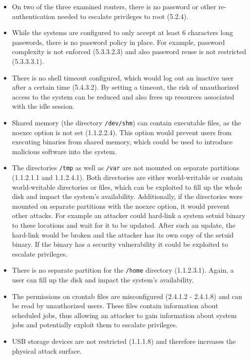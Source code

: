 \begin{itemize}
    \item On two of the three examined routers, there is no password or other re-authentication needed to escalate privileges to root (5.2.4).
    \item While the systems are configured to only accept at least 6 characters long passwords, there is no password policy in place.
    For example, password complexity is not enforced (5.3.3.2.3) and also password reuse is not restricted (5.3.3.3.1).
    \item There is no shell timeout configured, which would log out an inactive user after a certain time (5.4.3.2).
    By setting a timeout, the risk of unauthorized access to the system can be reduced and also frees up resources associated with the idle session.
    \item Shared memory (the directory \texttt{/dev/shm}) can contain executable files, as the noexec option is not set (1.1.2.2.4).
    This option would prevent users from executing binaries from shared memory, which could be used to introduce malicious software into the system.
    \item The directories \texttt{/tmp} as well as \texttt{/var} are not mounted on separate partitions (1.1.2.1.1 and 1.1.2.4.1).
    Both directories are either world-writable or contain world-writable directories or files, which can be exploited to fill up the whole disk and impact the system's availability.
    Additionally, if the directories were mounted on separate partitions with the noexec option, it would prevent other attacks.
    For example an attacker could hard-link a system setuid binary to these locations and wait for it to be updated.
    After such an update, the hard-link would be broken and the attacker has its own copy of the setuid binary.
    If the binary has a security vulnerability it could be exploited to escalate privileges.
    \item There is no separate partition for the \texttt{/home} directory (1.1.2.3.1).
    Again, a user can fill up the disk and impact the system's availability.
    \item The permissions on crontab files are misconfigured (2.4.1.2 - 2.4.1.8) and can be read by unauthorized users.
    These files contain information about scheduled jobs, thus allowing an attacker to gain information about system jobs and potentially exploit them to escalate privileges.
    \item USB storage devices are not restricted (1.1.1.8) and therefore increases the physical attack surface.

\end{itemize}
